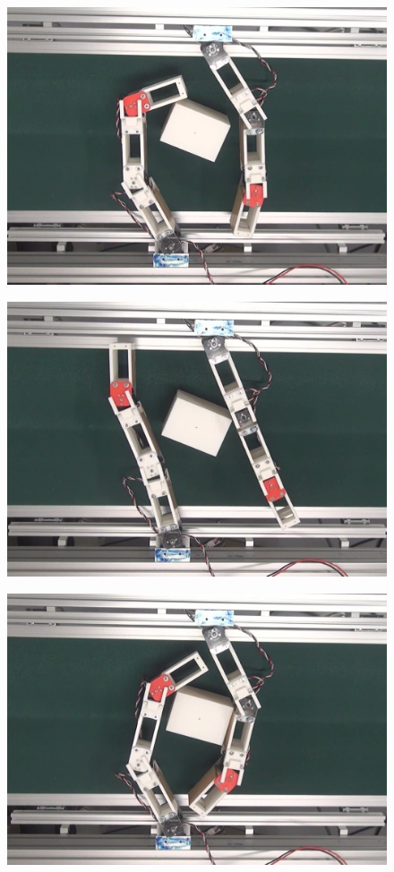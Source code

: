 \documentclass[a4paper,twoside,12pt,papersize, dvipdfmx]{iirthesis}
\begin{document}
\begin{figure}[b]
\centering
\begin{minipage}{0.249\hsize}
\centering
\includegraphics[width=0.98\hsize]{fig/4-manipulation-result/Rectangle/2-1.jpg}
\subcaption{}\label{}
\end{minipage}\hfill
\begin{minipage}{0.249\hsize}
\centering
\includegraphics[width=0.98\hsize]{fig/4-manipulation-result/Rectangle/2-2.jpg}
\subcaption{}\label{}
\end{minipage}\hfill
\begin{minipage}{0.249\hsize}
\centering
\includegraphics[width=0.98\hsize]{fig/4-manipulation-result/Rectangle/2-3.jpg}

\end{minipage}
\end{figure}
\end{document}
